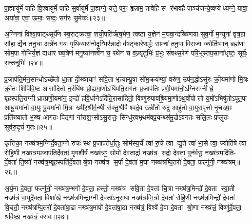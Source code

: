 पा॒ह्यायु॑र्मे पाहि वि॒श्वायु॑र्मे पाहि स॒र्वायु॑र्मे पा॒ह्यग्ने॒ यत्ते॒ पर॒ꣳ॒ हृन्नाम॒ तावेहि॒ स र॑भावहै॒ पाञ्च॑जन्ये॒ष्वप्येध्यग्ने॒ यावा॒ अया॑वा॒ एवा॒ ऊमाः॒ सब्दः॒ सग॑रः सु॒मेकः॑॥२३॥

{\anuvakamend[{व्या॒नम्मे॒ द्वात्रिꣳ॑शच्च॥७॥}]}

अ॒ग्निना॑ विश्वा॒षाट्थ्सूर्ये॑ण स्व॒राट्क्रत्वा॒ शची॒पति॑र्\mbox{}ऋष॒भेण॒ त्वष्टा॑ य॒ज्ञेन॑ म॒घवा॒न्दख्षि॑णया सुव॒र्गो म॒न्युना॑ वृत्र॒हा सौहार्द्येन तनू॒धा अन्ने॑न॒ गयः॑ पृथि॒व्यास॑नोदृ॒ग्भिर॑न्ना॒दो व॑षट्का॒रेण॒र्द्धः साम्ना॑ तनू॒पा वि॒राजा॒ ज्योति॑ष्मा॒न् ब्रह्म॑णा सोम॒पा गोभि॑र्य॒ज्ञं दा॑धार ख्ष॒त्रेण॑ मनु॒ष्या॑नश्वे॑न च॒ रथे॑न च व॒ज्र्यृ॑तुभिः॑ प्र॒भुः सं॑वथ्स॒रेण॑ परि॒भूस्तप॒साना॑धृष्टः॒ सूर्यः॒ सन्त॒नूभिः॑॥२४॥

{\anuvakamend[{अ॒ग्निनैका॒न्नप॑ञ्चा॒शत्॥८॥}]}

प्र॒जाप॑ति॒र्मन॒सान्धोऽच्छे॑तो धा॒ता दी॒ख्षायाꣳ॑ सवि॒ता भृ॒त्याम्पू॒षा सो॑म॒क्रय॑ण्यां॒ वरु॑ण॒ उप॑न॒द्धोऽसु॑रः क्री॒यमा॑णो मि॒त्रः क्री॒तः शि॑पिवि॒ष्ट आसा॑दितो न॒रंधि॑षः प्रो॒ह्यमा॒णोऽधि॑पति॒राग॑तः प्र॒जाप॑तिः प्रणी॒यमा॑नो॒ऽग्निराग्नीध्रे॒ बृह॒स्पति॒राग्नीध्रात्प्रणी॒यमा॑न॒ इन्द्रो॑ हवि॒र्धानेऽदि॑ति॒रासा॑दितो॒ विष्णु॑रुपावह्रि॒यमा॒णोऽथ॒र्वोपोत्तो य॒मो॑ऽभिषु॑तोऽपूत॒पा आ॑धू॒यमा॑नो वा॒युः पू॒यमा॑नो मि॒त्रः ख्षी॑र॒श्रीर्म॒न्थी स॑क्तु॒श्रीर्वैश्वदे॒व उन्नी॑तो रुद्र॒ आहु॑तो वा॒युरावृ॑त्तो नृ॒चख्षाः॒ प्रति॑ख्यातो भ॒ख्ष आग॑तः पितृ॒णां ना॑राश॒ꣳ॒सोऽसु॒रात्तः॒ सिन्धु॑रवभृ॒थम॑वप्र॒यन्थ्स॑मु॒द्रोऽव॑गतः सलि॒लः प्रप्लु॑तः सुव॑रु॒दृचं॑ ग॒तः॥२५॥

{\anuvakamend[{रु॒द्र एक॑विशतिश्च॥८॥}]}

कृत्ति॑का॒ नख्ष॑त्रम॒ग्निर्दे॒वता॒ग्ने रुचः॑ स्थ प्र॒जाप॑तेर्धा॒तुः सोम॑स्य॒र्चे त्वा॑ रु॒चे त्वा द्यु॒ते त्वा॑ भा॒से त्वा॒ ज्योति॑षे त्वा रोहि॒णी नख्ष॑त्रम्प्र॒जाप॑तिर्दे॒वता॑ मृगशी॒र्\mbox{}षं नख्ष॑त्र॒ꣳ॒ सोमो॑ दे॒वता॒र्द्रा नख्ष॑त्र रु॒द्रो दे॒वता॒ पुन॑र्वसू॒ नख्ष॑त्र॒मदि॑ति- र्दे॒वता॑ ति॒ष्यो॑ नख्ष॑त्र॒म्बृह॒स्पति॑र्दे॒वताश्रे॒षा नख्ष॑त्र स॒र्पा दे॒वता॑ म॒घा नख्ष॑त्रम्पि॒तरो॑ दे॒वता॒ फल्गु॑नी॒ नख्ष॑त्रम्॥२६॥

अ॒र्य॒मा दे॒वता॒ फल्गु॑नी॒ नख्ष॑त्र॒म्भगो॑ दे॒वता॒ हस्तो॒ नख्ष॑त्र सवि॒ता दे॒वता॑ चि॒त्रा नख्ष॑त्र॒मिन्द्रो॑ दे॒वता स्वा॒ती नख्ष॑त्रं वा॒युर्दे॒वता॒ विशा॑खे॒ नख्ष॑त्रमिन्द्रा॒ग्नी दे॒वता॑ऽनूरा॒धा नख्ष॑त्रम्मि॒त्रो दे॒वता॑ रोहि॒णी नख्ष॑त्र॒मिन्द्रो॑ दे॒वता॑ वि॒चृतौ॒ नख्ष॑त्रम्पि॒तरो॑ दे॒वता॑षा॒ढा नख्ष॑त्र॒मापो॑ दे॒वता॑षा॒ढा नख्ष॑त्रं॒ विश्वे॑ दे॒वा दे॒वता श्रो॒णा नख्ष॑त्त्रं॒ विष्णु॑र्दे॒वता॒ श्रवि॑ष्ठा॒ नख्ष॑त्रं॒ वस॑वः॥२७॥

